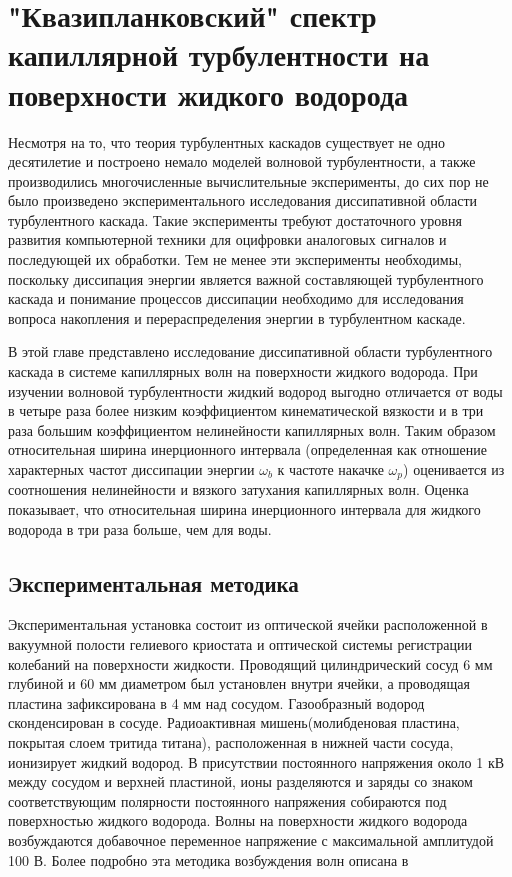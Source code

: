 \chapter{"Квазипланковский" спектр капиллярной турбулентности на поверхности жидкого водорода}

Несмотря на то, что теория турбулентных каскадов существует не одно десятилетие и построено немало моделей волновой турбулентности, а также производились многочисленные вычислительные эксперименты, до сих пор не было произведено экспериментального исследования диссипативной области турбулентного каскада. Такие эксперименты требуют достаточного уровня развития компьютерной техники для оцифровки аналоговых сигналов и последующей их обработки. Тем не менее эти эксперименты необходимы, поскольку диссипация энергии является важной составляющей турбулентного каскада и понимание процессов диссипации необходимо для исследования вопроса накопления и перераспределения энергии в турбулентном каскаде. %

В этой главе представлено исследование диссипативной области турбулентного каскада в системе капиллярных волн на поверхности жидкого водорода. При изучении волновой турбулентности жидкий водород выгодно отличается от воды в четыре раза более низким коэффициентом кинематической вязкости и в три раза большим коэффициентом нелинейности капиллярных волн. Таким образом относительная ширина инерционного интервала (определенная как отношение характерных частот диссипации энергии $\omega_b$ к частоте накачке $\omega_p$) оценивается из соотношения нелинейности и вязкого затухания капиллярных волн. Оценка показывает, что относительная ширина инерционного интервала для жидкого водорода в три раза больше, чем для воды.

\section{Экспериментальная методика} %
 Экспериментальная установка состоит из оптической ячейки расположенной в вакуумной полости гелиевого криостата и оптической системы регистрации колебаний на поверхности жидкости. Проводящий цилиндрический сосуд 6 мм глубиной и 60 мм диаметром был установлен внутри ячейки, а проводящая пластина зафиксирована в 4 мм над сосудом. Газообразный водород сконденсирован в сосуде. Радиоактивная мишень(молибденовая пластина, покрытая слоем тритида титана), расположенная в нижней части сосуда, ионизирует жидкий водород. В присутствии постоянного напряжения около 1 кВ между сосудом и верхней пластиной, ионы разделяются и заряды со знаком соответствующим полярности постоянного напряжения собираются под поверхностью жидкого водорода. Волны на поверхности жидкого водорода возбуждаются добавочное переменное напряжение с максимальной амплитудой 100 В. Более подробно эта методика возбуждения волн описана в \cite{Brazhnikov_IET}


